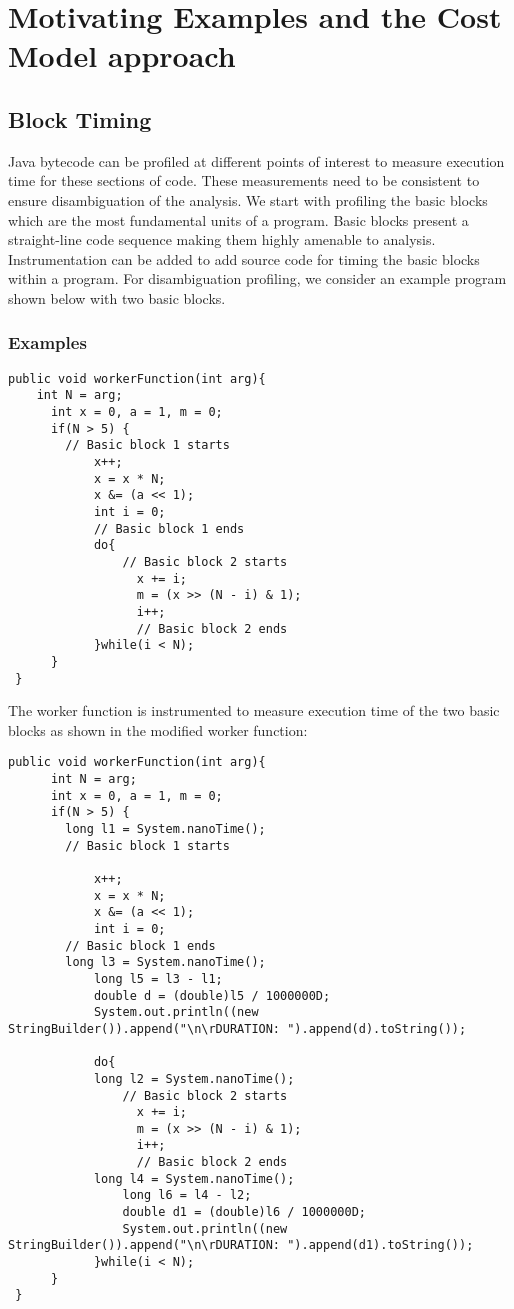 \chapter{Motivating Examples and the Cost Model approach}
\label{examples}
\section{Block Timing}
Java bytecode can be profiled at different points of interest to measure execution time for these sections of code. These measurements need to be consistent to ensure disambiguation of the analysis.\newline 
We start with profiling the basic blocks which are the most fundamental units of a program. Basic blocks present a straight-line code sequence making them highly amenable to analysis. Instrumentation can be added to add source code for timing the basic blocks within a program. For disambiguation profiling, we consider an example program shown below with two basic blocks.\newline
\subsection{Examples}
\singlespacing
\begin{lstlisting}
public void workerFunction(int arg){
	int N = arg;
      int x = 0, a = 1, m = 0;
      if(N > 5) {
      	// Basic block 1 starts
            x++;
            x = x * N;
            x &= (a << 1);
            int i = 0;
            // Basic block 1 ends
            do{
            	// Basic block 2 starts
                  x += i;
                  m = (x >> (N - i) & 1);
                  i++;
                  // Basic block 2 ends
            }while(i < N);
      }
 }
\end{lstlisting}
\doublespacing

The worker function is instrumented to measure execution time of the two basic blocks as shown in the modified worker function:

\singlespacing
\begin{lstlisting}
public void workerFunction(int arg){
	  int N = arg;
      int x = 0, a = 1, m = 0;
      if(N > 5) {
		long l1 = System.nanoTime();
      	// Basic block 1 starts
    
            x++;
            x = x * N;
            x &= (a << 1);
            int i = 0;
		// Basic block 1 ends
		long l3 = System.nanoTime();
            long l5 = l3 - l1;
            double d = (double)l5 / 1000000D;
            System.out.println((new StringBuilder()).append("\n\rDURATION: ").append(d).toString());
            
            do{
			long l2 = System.nanoTime();
            	// Basic block 2 starts
                  x += i;
                  m = (x >> (N - i) & 1);
                  i++;
                  // Basic block 2 ends
		    long l4 = System.nanoTime();
                long l6 = l4 - l2;
                double d1 = (double)l6 / 1000000D;
                System.out.println((new StringBuilder()).append("\n\rDURATION: ").append(d1).toString());
            }while(i < N);
      }
 }
\end{lstlisting}
\doublespacing


